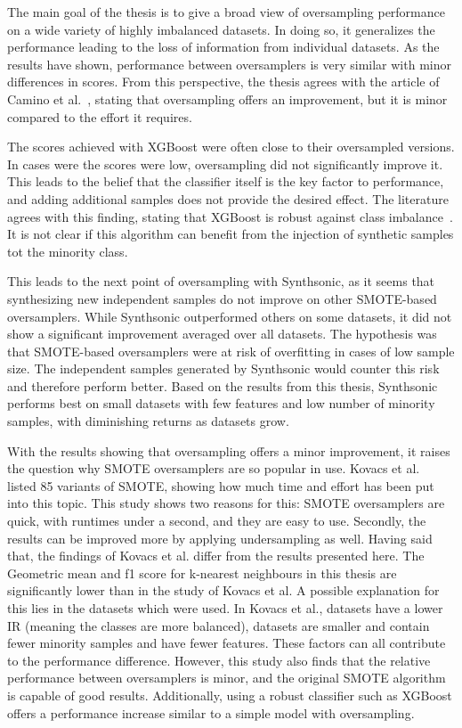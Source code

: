 The main goal of the thesis is to give a broad view of oversampling performance on a wide variety of highly imbalanced datasets. In doing so, it generalizes the performance leading to the loss of information from individual datasets. As the results have shown, performance between oversamplers is very similar with minor differences in scores. From this perspective, the thesis agrees with the article of Camino et al.~\cite{Camino2020OversamplingEffort}, stating that oversampling offers an improvement, but it is minor compared to the effort it requires. 

The scores achieved with XGBoost were often close to their oversampled versions. In cases were the scores were low, oversampling did not significantly improve it. This leads to the belief that the classifier itself is the key factor to performance, and adding additional samples does not provide the desired effect. The literature agrees with this finding, stating that XGBoost is robust against class imbalance~\cite{Camino2020OversamplingEffort}. It is not clear if this algorithm can benefit from the injection of synthetic samples tot the minority class.

This leads to the next point of oversampling with Synthsonic, as it seems that synthesizing new independent samples do not improve on other SMOTE-based oversamplers. While Synthsonic outperformed others on some datasets, it did not show a significant improvement averaged over all datasets. The hypothesis was that SMOTE-based oversamplers were at risk of overfitting in cases of low sample size. The independent samples generated by Synthsonic would counter this risk and therefore perform better. Based on the results from this thesis, Synthsonic performs best on small datasets with few features and low number of minority samples, with diminishing returns as datasets grow.

With the results showing that oversampling offers a minor improvement, it raises the question why SMOTE oversamplers are so popular in use. Kovacs et al.~\cite{Kovacs2019AnDatasets} listed 85 variants of SMOTE, showing how much time and effort has been put into this topic. This study shows two reasons for this: SMOTE oversamplers are quick, with runtimes under a second, and they are easy to use. Secondly, the results can be improved more by applying undersampling as well. Having said that, the findings of Kovacs et al. differ from the results presented here. The Geometric mean and f1 score for k-nearest neighbours in this thesis are significantly lower than in the study of Kovacs et al. A possible explanation for this lies in the datasets which were used. In Kovacs et al., datasets have a lower IR (meaning the classes are more balanced), datasets are smaller and contain fewer minority samples and have fewer features. These factors can all contribute to the performance difference. However, this study also finds that the relative performance between oversamplers is minor, and the original SMOTE algorithm is capable of good results. Additionally, using a robust classifier such as XGBoost offers a performance increase similar to a simple model with oversampling.  


